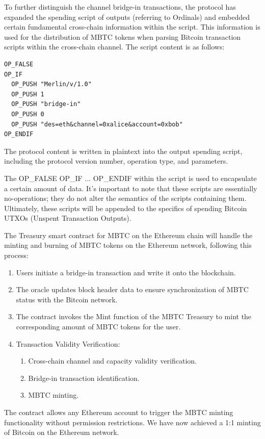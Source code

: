 \documentclass{article}
\begin{document}
\par To further distinguish the channel bridge-in transactions, the protocol has expanded the spending script of outputs (referring to Ordinals) and embedded certain fundamental cross-chain information within the script. This information is used for the distribution of MBTC tokens when parsing Bitcoin transaction scripts within the cross-chain channel. The script content is as follows:
\begin{verbatim}
OP_FALSE
OP_IF
  OP_PUSH "Merlin/v/1.0"
  OP_PUSH 1
  OP_PUSH "bridge-in"
  OP_PUSH 0
  OP_PUSH "des=eth&channel=0xalice&account=0xbob"
OP_ENDIF
\end{verbatim}
\par The protocol content is written in plaintext into the output spending script, including the protocol version number, operation type, and parameters.
\par The OP\_FALSE OP\_IF ... OP\_ENDIF within the script is used to encapsulate a certain amount of data. It's important to note that these scripts are essentially no-operations; they do not alter the semantics of the scripts containing them. Ultimately, these scripts will be appended to the specifics of spending Bitcoin UTXOs (Unspent Transaction Outputs).
\par The Treasury smart contract for MBTC on the Ethereum chain will handle the minting and burning of MBTC tokens on the Ethereum network, following this process:
\begin{enumerate}
    \item Users initiate a bridge-in transaction and write it onto the blockchain.
    \item The oracle updates block header data to ensure synchronization of MBTC status with the Bitcoin network.
    \item The contract invokes the Mint function of the MBTC Treasury to mint the corresponding amount of MBTC tokens for the user.
    \item Transaction Validity Verification:
        \begin{enumerate}
            \item Cross-chain channel and capacity validity verification.
            \item Bridge-in transaction identification.
            \item MBTC minting.
        \end{enumerate}
\end{enumerate}
\par The contract allows any Ethereum account to trigger the MBTC minting functionality without permission restrictions. We have now achieved a 1:1 minting of Bitcoin on the Ethereum network.
\end{document}
